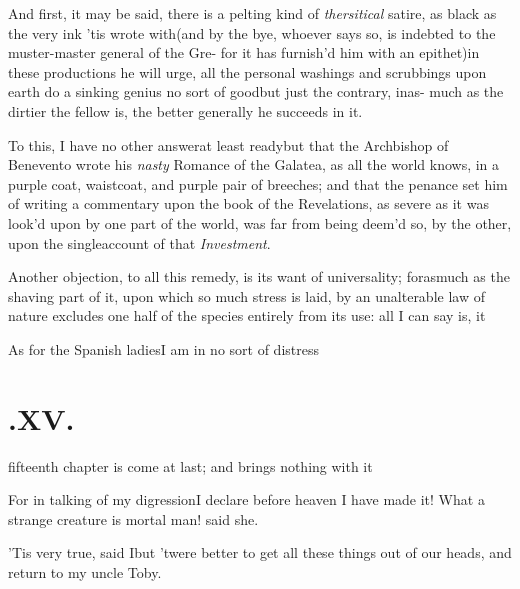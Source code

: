 \documentclass{article}
\begin{document}
And first, it may be said, there is a pelting kind of
\textit{thersitical} satire, as black as the very ink ’tis
wrote with\tsh (and by the bye, whoever says so, is
indebted to the muster-master general of the Gre-
for it has
furnish’d him with an epithet)\break\tsh in these
productions he will urge, all the personal washings and scrubbings
upon earth do a sinking genius no sort of good\tsh but
just the contrary, inas- much as the dirtier the fellow is, the\break
better generally he succeeds in it.

To this, I have no other answer\tsh\break at least
ready\tsk\tsk but that the Archbishop of Benevento
wrote his \textit{nasty} Romance of the Galatea, as all the
world knows, in a purple coat, waistcoat, and purple pair of
breeches; and that the penance set him of writing a commentary upon
the book of the Revelations, as severe as it was
look’d upon by one part of the world, was far from being
deem’d so, by the other, upon the single\break account of that
\textit{Investment}.

Another objection, to all this remedy, is its want of
universality; forasmuch as the shaving part of it, upon which so
much stress is laid, by an unalterable law of nature excludes one
half of the species entirely from its use: all I can say is,
it\tsh

As for the Spanish ladies\tsh I am in no sort of
distress\tsh

\vfill{}\eject
\null{}\baselineskip
\section{.\enspace XV.}

 fifteenth chapter is come at
last; and brings nothing with it 

For in talking of my digression\tsh\break I declare before
heaven I have made it! What a strange creature is mortal man! said
she.

’Tis very true, said I\tsh but ’twere
better to get all these things out of our heads, and return to my
uncle Toby.

\vfill{}\eject
\null{}\baselineskip
\end{document}
